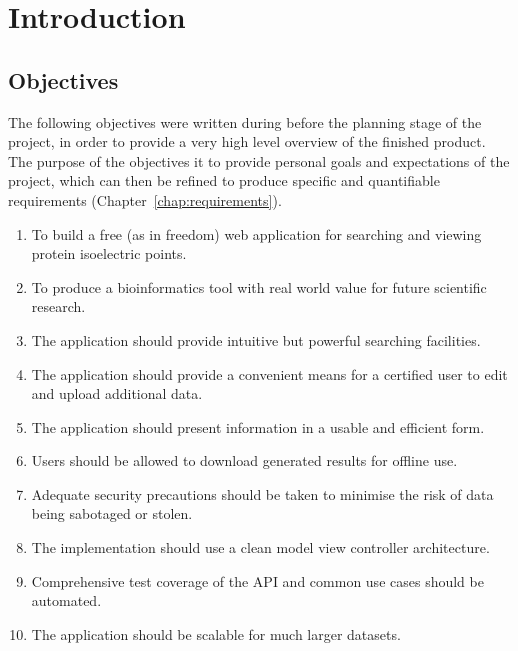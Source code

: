 \chapter{Introduction}\label{chap:introduction}




\section*{Objectives}\label{sec:objectives}
The following objectives were written during before the planning stage
of the project, in order to provide a very high level overview of the
finished product. The purpose of the objectives it to provide personal
goals and expectations of the project, which can then be refined to
produce specific and quantifiable requirements
(Chapter~\ref{chap:requirements}).

\begin{enumerate}
\item To build a free (as in freedom) web application for searching
  and viewing protein isoelectric points.
\item To produce a bioinformatics tool with real world value for
  future scientific research.
\item The application should provide intuitive but powerful searching
  facilities.
\item The application should provide a convenient means for a
  certified user to edit and upload additional data.
\item The application should present information in a usable and
  efficient form.
\item Users should be allowed to download generated results for
  offline use.
\item Adequate security precautions should be taken to minimise the
  risk of data being sabotaged or stolen.
\item The implementation should use a clean model view controller
  architecture.
\item Comprehensive test coverage of the API and common use cases
  should be automated.
\item The application should be scalable for much larger datasets.
\end{enumerate}

